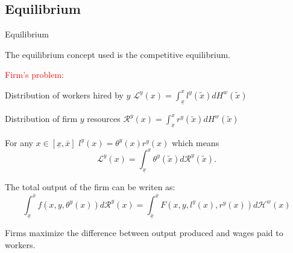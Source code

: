 \documentclass[notes,11pt, aspectratio=169]{beamer}
\newenvironment{wideitemize}{\itemize\addtolength{\itemsep}{10pt}}{\enditemize}
\begin{document}
\subsection{Equilibrium}
\begin{frame}{Equilibrium}
	\begin{wideitemize}
		\item The equilibrium concept used is the competitive equilibrium.
		\pause
		\item \textcolor{red}{Firm's problem:}
		\begin{wideitemize}
			\item  Distribution of workers hired by $y$ $\mathcal{L}^y(x) = \int_{\underline{x}}^xl^y(\tilde{x})dH^w(\tilde{x})$ 
			\item  Distribution of firm $y$ resources $\mathcal{R}^y(x) = \int_{\underline{x}}^xr^y(\tilde{x})dH^w(\tilde{x})$
			\pause
			\item  For any $x\in[\underline{x}, \bar{x}]$ $l^y(x) = \theta^y(x)r^y(x)$ which means 
			\begin{equation}\label{labor_demand}
			\mathcal{L}^y(x) = \int_{\underline{x}}^x\theta^y(\tilde{x})d\mathcal{R}^y(\tilde{x}).
			\end{equation}
			\item The total output of the firm can be writen as:
			\[\int_{\underline{x}}^{\overline{x}} f\left(x, y, \theta^{y}(x)\right) d \mathcal{R}^{y}(x) = \int_{\underline{x}}^{\overline{x}} F\left(x, y, l^y(x), r^y(x)\right) d \mathcal{H}^{w}(x)\]
			\item  Firms maximize the difference between output produced and wages paid to workers.  
		\end{wideitemize}
	\end{wideitemize}
\end{frame}
\end{document}
